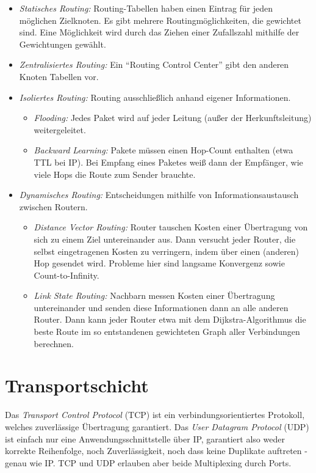 \documentclass[a4paper,parskip=half*,DIV=15,fontsize=11pt]{scrartcl}
\begin{document}
\begin{itemize}
\item \emph{Statisches Routing:} Routing-Tabellen haben einen Eintrag für jeden möglichen Zielknoten. Es gibt mehrere Routingmöglichkeiten, die gewichtet sind. Eine Möglichkeit wird durch das Ziehen einer Zufallszahl mithilfe der Gewichtungen gewählt.
\item \emph{Zentralisiertes Routing:} Ein ``Routing Control Center'' gibt den anderen Knoten Tabellen vor.
\item \emph{Isoliertes Routing:} Routing ausschließlich anhand eigener Informationen.
    \begin{itemize}
    \item \emph{Flooding:} Jedes Paket wird auf jeder Leitung (außer der Herkunftsleitung) weitergeleitet.
    \item \emph{Backward Learning:} Pakete müssen einen Hop-Count enthalten (etwa TTL bei IP). Bei Empfang eines Paketes weiß dann der Empfänger, wie viele Hops die Route zum Sender brauchte.
    \end{itemize}
\item \emph{Dynamisches Routing:} Entscheidungen mithilfe von Informationsaustausch zwischen Routern.
    \begin{itemize}
    \item \emph{Distance Vector Routing:} Router tauschen Kosten einer Übertragung von sich zu einem Ziel untereinander aus. Dann versucht jeder Router, die selbst eingetragenen Kosten zu verringern, indem über einen (anderen) Hop gesendet wird. Probleme hier sind langsame Konvergenz sowie Count-to-Infinity.
    \item \emph{Link State Routing:} Nachbarn messen Kosten einer Übertragung untereinander und senden diese Informationen dann an alle anderen Router. Dann kann jeder Router etwa mit dem Dijkstra-Algorithmus die beste Route im so entstandenen gewichteten Graph aller Verbindungen berechnen.
    \end{itemize}
\end{itemize}

\section{Transportschicht}

Das \emph{Transport Control Protocol} (TCP) ist ein verbindungsorientiertes Protokoll, welches zuverlässige Übertragung garantiert. Das \emph{User Datagram Protocol} (UDP) ist einfach nur eine Anwendungsschnittstelle über IP, garantiert also weder korrekte Reihenfolge, noch Zuverlässigkeit, noch dass keine Duplikate auftreten - genau wie IP. TCP und UDP erlauben aber beide Multiplexing durch Ports.
\end{document}
